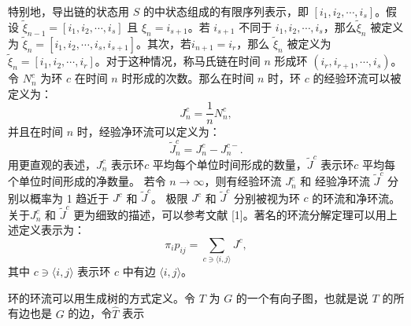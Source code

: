特别地，导出链的状态用 $S$ 的中状态组成的有限序列表示，即 $[i_1,i_2,\cdots,i_s]$。假设 $\tilde{\xi}_{n-1}=[i_1,i_2,\cdots,i_s]$ 且 $\xi_n = i_{s+1}$。若 $i_{s+1}$ 不同于 $i_1,i_2,\cdots,i_s$，那么$\tilde{\xi}_n$ 被定义为 $\tilde{\xi}_n = [i_1,i_2,\cdots,i_s,i_{s+1}]$。其次，若$i_{n+1}=i_r$，那么 $\tilde{\xi}_n$ 被定义为 $\tilde{\xi}_n = [i_1,i_2,\cdots,i_r]$。对于这种情况，称马氏链在时间 $n$ 形成环 $(i_r,i_{r+1},\cdots,i_s)$。令 $N^c_n$ 为环 $c$ 在时间 $n$ 时形成的次数。那么在时间 $n$ 时，环 $c$ 的经验环流可以被定义为：
\begin{equation*}
    J_n^c = \frac{1}{n}N^c_n,
\end{equation*}
并且在时间 $n$ 时，经验净环流可以定义为：
\begin{equation*}
    \tilde{J}^c_n = J^c_n-J^{c-}_n.
\end{equation*}
用更直观的表述，$J^c_n$ 表示环$c$ 平均每个单位时间形成的数量，$\tilde{J}^c$ 表示环$c$ 平均每个单位时间形成的净数量。
若令 $n\rightarrow\infty$，则有经验环流 $J^c_n$ 和 经验净环流 $\tilde{J}^c$ 分别以概率为 1 趋近于 $J^c$ 和 $\tilde{J}^c$。
极限 $J^c$ 和 $\tilde{J}^c$ 分别被视为环 $c$ 的环流和净环流。关于$J^c_n$ 和 $\tilde{J}^c$ 更为细致的描述，可以参考文献 [1]。著名的环流分解定理可以用上述定义表示为：
\begin{equation}\label{decomposition}
    \pi_ip_{ij} = \sum_{c\ni\langle i,j\rangle}J^c,
\end{equation}
其中 $c \ni \langle i, j\rangle$ 表示环 $c$ 中有边 $\langle i, j\rangle$。

环的环流可以用生成树的方式定义。令 $T$ 为 $G$ 的一个有向子图，也就是说 $T$ 的所有边也是 $G$ 的边，令$\hat{T}$ 表示
